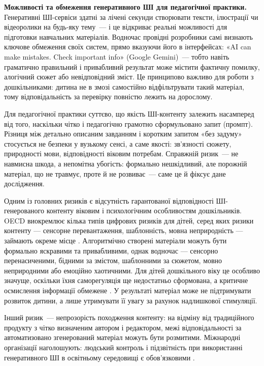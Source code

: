 \documentclass[14pt, a4paper]{extreport}
\begin{document}
\textbf{Можливості та обмеження генеративного ШІ для педагогічної практики.}
Генеративні ШІ-сервіси здатні за лічені секунди створювати тексти, ілюстрації чи відеоролики на будь-яку тему~--- і це відкриває реальні можливості для підготовки навчальних матеріалів. Водночас провідні розробники самі визнають ключове обмеження своїх систем, прямо вказуючи його в інтерфейсах: «AI can make mistakes. Check important info» (Google Gemini)~--- тобто навіть граматично правильний і привабливий результат може містити фактичну помилку, алогічний сюжет або невідповідний зміст. Це принципово важливо для роботи з дошкільниками: дитина не в змозі самостійно відфільтрувати такий матеріал, тому відповідальність за перевірку повністю лежить на дорослому.

Для педагогічної практики суттєво, що якість ШІ-контенту залежить насамперед від того, наскільки чітко і педагогічно грамотно сформульовано запит (промпт). Різниця між детально описаним завданням і коротким запитом «без задуму» стосується не безпеки у вузькому сенсі, а саме якості: зв'язності сюжету, природності мови, відповідності віковим потребам. Справжній ризик~--- не навмисна шкода, а непомітна убогість: формально нешкідливий, але порожній матеріал, що не травмує, проте й не розвиває~--- саме це й фіксує дане дослідження.

Одним із головних ризиків є відсутність гарантованої відповідності ШІ-генерованого контенту віковим і психологічним особливостям дошкільників. OECD виокремлює кілька типів цифрових ризиків для дітей, серед яких ризики контенту --- сенсорне перевантаження, шаблонність, мовна неприродність --- займають окреме місце \cite{OECD2021}. Алгоритмічно створені матеріали можуть бути формально яскравими та привабливими, однак водночас --- сенсорно перенасиченими, бідними за змістом, шаблонними за сюжетом, мовно неприродними або емоційно хаотичними. Для дітей дошкільного віку це особливо значуще, оскільки їхня саморегуляція ще недостатньо сформована, а критичне осмислення інформації обмежене \cite{PavelkivTsyhypalo2006,DutkevychDoshkilna2007,Radesky2023,OECD2025}. У результаті матеріал може не підтримувати розвиток дитини, а лише утримувати її увагу за рахунок надлишкової стимуляції.

Інший ризик~--- непрозорість походження контенту: на відміну від традиційного продукту з чітко визначеним автором і редактором, межі відповідальності за автоматизовано згенерований матеріал можуть бути розмитими. Міжнародні організації наголошують: людський контроль і підзвітність при використанні генеративного ШІ в освітньому середовищі є обов'язковими \cite{UNESCO2023,UNICEFAI2021,UNCRC25}.
\end{document}
